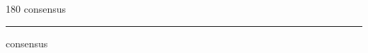
\begin{frame}
\begin{center}
\begin{turn}{180}
{\fontsize{2.5cm}{1em}\selectfont consensus}
\end{turn}
\vspace{1em}\par  
\hrule
\vspace{1em}\par  
{\fontsize{2.5cm}{1em}\selectfont consensus}
\end{center}
\end{frame}
